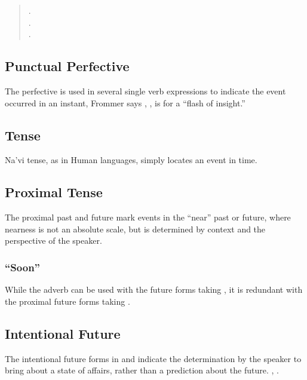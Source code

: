 \begin{quotation}
\noindent{}.\\
\indent{}.\\

\noindent{}.\\
\indent{}
\end{quotation}

\subsection{Punctual Perfective} The perfective is used in several
single verb expressions to indicate the event occurred in an instant,
   
Frommer says , , is for a ``flash of insight.''

\subsection{Tense} Na'vi tense, as in Human languages, simply locates
an event in time.


\subsection{Proximal Tense} The proximal past and future mark events
in the ``near'' past or future, where nearness is not an absolute
scale, but is determined by context and the perspective of the
speaker.

\subsubsection{``Soon''} While the adverb   can be used
with the future forms taking , it is redundant with the
proximal future forms taking .

\subsection{Intentional Future} The intentional future forms in
 and  indicate the deter\-mina\-tion by the
speaker to bring about a state of affairs, rather than a prediction
about the future.   , 
.\label{syn:verb:intenfut}

